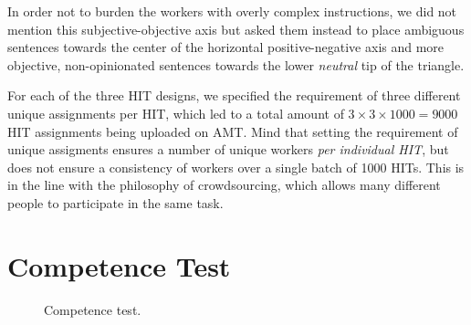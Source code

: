 \documentclass[11pt]{elsarticle}
\begin{document}
In order not to burden the workers with overly complex instructions, we did not mention this subjective-objective axis but asked them instead to place ambiguous sentences towards the center of the horizontal positive-negative axis and more objective, non-opinionated sentences towards the lower \textit{neutral} tip of the triangle.

For each of the three HIT designs, we specified the requirement of three different unique assignments per HIT, which led to a total amount of $3 \times 3 \times 1000 = 9000$ HIT assignments being uploaded on AMT. Mind that setting the requirement of unique assigments ensures a number of unique workers \textit{per individual HIT}, but does not ensure a consistency of workers over a single batch of 1000 HITs. This is in the line with the philosophy of crowdsourcing, which allows many different people to participate in the same task.


\section{Competence Test}
\label{sect:comtest}


\begin{figure}[h]
  \begin{center}
\caption{Competence test.}
\label{comtest}
  \end{center}
\end{figure}
\end{document}
